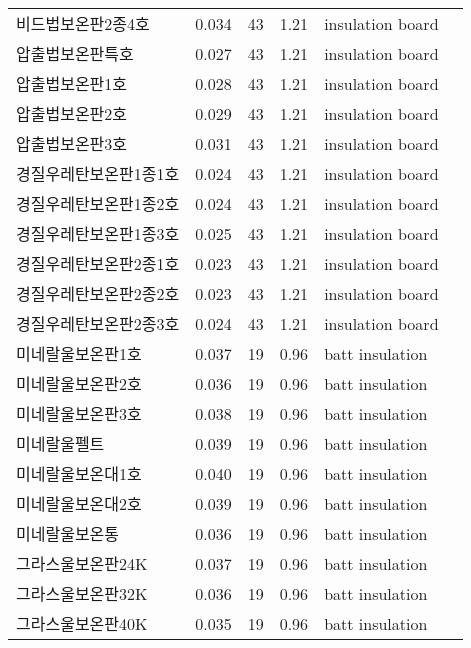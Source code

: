 \begin{longtable}{llcclc}
  비드법보온판2종4호 &   0.034 &   43 & 1.21 & insulation board & \cite{ashrae_f18} \\
  압출법보온판특호 &   0.027 &   43 & 1.21 & insulation board & \cite{ashrae_f18} \\
  압출법보온판1호 &   0.028 &   43 & 1.21 & insulation board & \cite{ashrae_f18} \\
  압출법보온판2호 &   0.029 &   43 & 1.21 & insulation board & \cite{ashrae_f18} \\
  압출법보온판3호 &   0.031 &   43 & 1.21 & insulation board & \cite{ashrae_f18} \\
  경질우레탄보온판1종1호 &   0.024 &   43 & 1.21 & insulation board & \cite{ashrae_f18} \\
  경질우레탄보온판1종2호 &   0.024 &   43 & 1.21 & insulation board & \cite{ashrae_f18} \\
  경질우레탄보온판1종3호 &   0.025 &   43 & 1.21 & insulation board & \cite{ashrae_f18} \\
  경질우레탄보온판2종1호 &   0.023 &   43 & 1.21 & insulation board & \cite{ashrae_f18} \\
  경질우레탄보온판2종2호 &   0.023 &   43 & 1.21 & insulation board & \cite{ashrae_f18} \\
  경질우레탄보온판2종3호 &   0.024 &   43 & 1.21 & insulation board & \cite{ashrae_f18} \\
  미네랄울보온판1호 &   0.037 &   19 & 0.96 & batt insulation & \cite{ashrae_f18} \\
  미네랄울보온판2호 &   0.036 &   19 & 0.96 & batt insulation & \cite{ashrae_f18} \\
  미네랄울보온판3호 &   0.038 &   19 & 0.96 & batt insulation & \cite{ashrae_f18} \\
  미네랄울펠트 &   0.039 &   19 & 0.96 & batt insulation & \cite{ashrae_f18} \\
  미네랄울보온대1호 &   0.040 &   19 & 0.96 & batt insulation & \cite{ashrae_f18} \\
  미네랄울보온대2호 &   0.039 &   19 & 0.96 & batt insulation & \cite{ashrae_f18} \\
  미네랄울보온통 &   0.036 &   19 & 0.96 & batt insulation & \cite{ashrae_f18} \\
  그라스울보온판24K &   0.037 &   19 & 0.96 & batt insulation & \cite{ashrae_f18} \\
  그라스울보온판32K &   0.036 &   19 & 0.96 & batt insulation & \cite{ashrae_f18} \\
  그라스울보온판40K &   0.035 &   19 & 0.96 & batt insulation & \cite{ashrae_f18} \\

\end{longtable}
